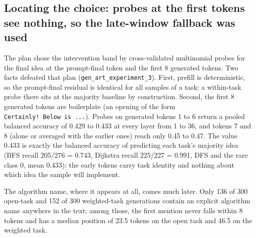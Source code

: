 \documentclass[11pt,letterpaper]{article}
\begin{document}
\subsection{Locating the choice: probes at the first tokens see nothing, so the late-window fallback was used}
The plan chose the intervention band by cross-validated multinomial probes for the final idea at the prompt-final token and the first 8 generated tokens. Two facts defeated that plan (\texttt{gen\_\allowbreak{}art\_\allowbreak{}experiment\_\allowbreak{}3}). First, prefill is deterministic, so the prompt-final residual is identical for all samples of a task; a within-task probe there sits at the majority baseline by construction. Second, the first 8 generated tokens are boilerplate (an opening of the form \texttt{Certainly!\ Below\ is\ ...}). Probes on generated tokens 1 to 6 return a pooled balanced accuracy of 0.429 to 0.433 at every layer from 1 to 36, and tokens 7 and 8 (alone or averaged with the earlier ones) reach only 0.45 to 0.47. The value 0.433 is exactly the balanced accuracy of predicting each task's majority idea (BFS recall 205/276 = 0.743, Dijkstra recall 225/227 = 0.991, DFS and the rare class 0, mean 0.433): the early tokens carry task identity and nothing about which idea the sample will implement.

The algorithm name, where it appears at all, comes much later. Only 136 of 300 open-task and 152 of 300 weighted-task generations contain an explicit algorithm name anywhere in the text; among those, the first mention never falls within 8 tokens and has a median position of 23.5 tokens on the open task and 46.5 on the weighted task.
\end{document}
